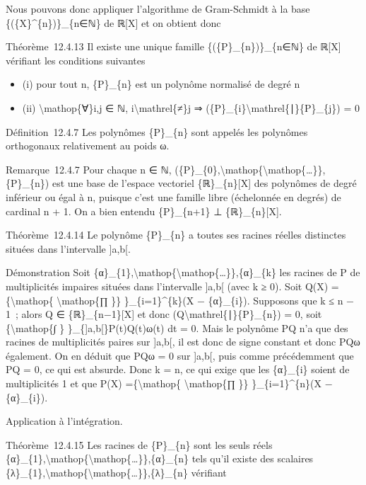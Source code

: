 \documentclass[]{article}
\begin{document}
Nous pouvons donc appliquer l'algorithme de Gram-Schmidt à la base
\{(\{X\}\^{}\{n\})\}\_\{n∈ℕ\} de ℝ{[}X{]} et on obtient donc

Théorème~12.4.13 Il existe une unique famille
\{(\{P\}\_\{n\})\}\_\{n∈ℕ\} de ℝ{[}X{]} vérifiant les conditions
suivantes

\begin{itemize}
\itemsep1pt\parskip0pt
\item
  (i) pour tout n, \{P\}\_\{n\} est un polynôme normalisé de degré n
\item
  (ii) \textbackslash{}mathop\{∀\}i,j ∈ ℕ,
  i\textbackslash{}mathrel\{≠\}j ⇒
  (\{P\}\_\{i\}\textbackslash{}mathrel\{∣\}\{P\}\_\{j\}) = 0
\end{itemize}

Définition~12.4.7 Les polynômes \{P\}\_\{n\} sont appelés les polynômes
orthogonaux relativement au poids ω.

Remarque~12.4.7 Pour chaque n ∈ ℕ,
(\{P\}\_\{0\},\textbackslash{}mathop\{\textbackslash{}mathop\{\ldots{}\}\},\{P\}\_\{n\})
est une base de l'espace vectoriel \{ℝ\}\_\{n\}{[}X{]} des polynômes de
degré inférieur ou égal à n, puisque c'est une famille libre (échelonnée
en degrés) de cardinal n + 1. On a bien entendu \{P\}\_\{n+1\} ⊥
\{ℝ\}\_\{n\}{[}X{]}.

Théorème~12.4.14 Le polynôme \{P\}\_\{n\} a toutes ses racines réelles
distinctes situées dans l'intervalle {]}a,b{[}.

Démonstration Soit
\{α\}\_\{1\},\textbackslash{}mathop\{\textbackslash{}mathop\{\ldots{}\}\},\{α\}\_\{k\}
les racines de P de multiplicités impaires situées dans l'intervalle
{]}a,b{[} (avec k ≥ 0). Soit Q(X) =\{\textbackslash{}mathop\{
\textbackslash{}mathop\{∏ \}\} \}\_\{i=1\}\^{}\{k\}(X − \{α\}\_\{i\}).
Supposons que k ≤ n − 1~; alors Q ∈ \{ℝ\}\_\{n−1\}{[}X{]} et donc
(Q\textbackslash{}mathrel\{∣\}\{P\}\_\{n\}) = 0, soit
\{\textbackslash{}mathop\{∫ \} \}\_\{{]}a,b{[}\}P(t)Q(t)ω(t) dt = 0.
Mais le polynôme PQ n'a que des racines de multiplicités paires sur
{]}a,b{[}, il est donc de signe constant et donc PQω également. On en
déduit que PQω = 0 sur {]}a,b{[}, puis comme précédemment que PQ = 0, ce
qui est absurde. Donc k = n, ce qui exige que les \{α\}\_\{i\} soient de
multiplicités 1 et que P(X) =\{\textbackslash{}mathop\{
\textbackslash{}mathop\{∏ \}\} \}\_\{i=1\}\^{}\{n\}(X − \{α\}\_\{i\}).

Application à l'intégration.

Théorème~12.4.15 Les racines de \{P\}\_\{n\} sont les seuls réels
\{α\}\_\{1\},\textbackslash{}mathop\{\textbackslash{}mathop\{\ldots{}\}\},\{α\}\_\{n\}
tels qu'il existe des scalaires
\{λ\}\_\{1\},\textbackslash{}mathop\{\textbackslash{}mathop\{\ldots{}\}\},\{λ\}\_\{n\}
vérifiant
\end{document}
